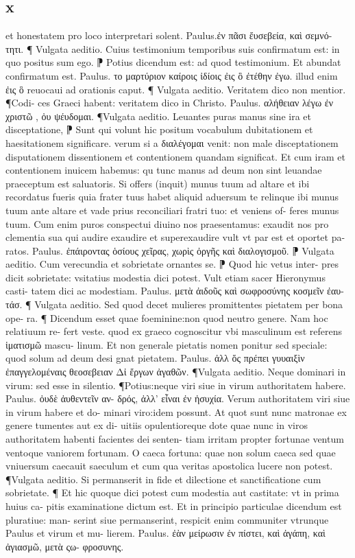 \documentclass{article}
\begin{document}
\begin{pages}
\section*{x }
\marginpar{[ p.204 ]}\pstart et honestatem pro loco interpretari solent. Paulus.ἐν πᾶσι ἔυσεβεία, καὶ σεμνό-   τητι.  ¶ Vulgata aeditio. Cuius testimonium temporibus suis confirmatum est: in quo   positus sum ego. ⁋ Potius dicendum est: ad quod testimonium. Et abundat confirmatum est. Paulus. το μαρτύριον καίροις ἰδίοις ἐις ὃ ἐτέθην ἐγω. illud enim ἐις ὃ   reuocaui ad orationis caput. ¶ Vulgata aeditio. Veritatem dico  non mentior. ¶Codi- ces Graeci habent: veritatem dico in Christo. Paulus. αλήθειαν λέγω ἐν χριστῶ , ὀυ ψέυδομαι. ¶Vulgata aeditio. Leuantes puras manus sine ira et disceptatione, ⁋ Sunt qui volunt hic positum vocabulum dubitationem et haesitationem significare. verum si a διαλέγομαι venit: non male disceptationem  disputationem dissentionem et contentionem quandam significat. Et cum iram et contentionem inuicem habemus: qu tunc manus ad deum non sint leuandae praeceptum est saluatoris. Si offers (inquit) munus tuum ad altare et ibi recordatus fueris quia frater tuus habet aliquid aduersum te  relinque ibi munus tuum ante altare et vade prius reconciliari fratri tuo: et veniens of- feres munus tuum. Cum enim puros conspectui diuino nos praesentamus: exaudit nos pro clementia sua qui audire exaudire  et superexaudire vult  vt par est et oportet pa- ratos. Paulus. ἐπάιροντας ὁσίους χεῖρας, χωρὶς ὀργῆς καὶ διαλογισμοῦ. ⁋ Vulgata aeditio. Cum verecundia et sobrietate ornantes se. ⁋ Quod hic vetus inter- pres dicit sobrietate: vsitatius modestia dici potest. Vult etiam sacer Hieronymus casti- tatem dici ac modestiam. Paulus. μετὰ ἀιδοῦς καὶ σωφροσύνης κοσμεῖν ἐαυ-   τάσ. ¶ Vulgata aeditio. Sed quod decet mulieres promittentes pietatem per bona ope- ra. ¶ Dicendum esset quae  foeminine:non quod  neutro genere. Nam hoc relatiuum re- fert veste. quod ex graeco cognoscitur vbi masculinum est referens ἱματισμῶ mascu- linum. Et non generale pietatis nomen ponitur sed speciale: quod solum ad deum desi gnat pietatem. Paulus. ἀλλ ὅς  πρέπει γυυαιξὶν ἐπαγγελομέναις θεοσεβειαν   Δἰ ἔργων ἀγαθῶν. ¶Vulgata aeditio. Neque  dominari in virum: sed esse in silentio. ¶Potius:neque  viri siue in virum authoritatem habere. Paulus. ὀυδὲ ἀυθεντεῖν αν- δρός, ἀλλ’ εἶναι ἐν ἠσυχία. Verum authoritatem viri siue in virum habere  et do- minari viro:idem possunt. At quot sunt nunc matronae ex genere tumentes aut ex di- uitiis opulentioreque  dote  quae nunc in viros authoritatem habenti facientes dei senten- tiam irritam propter fortunae ventum ventoque  vaniorem fortunam. O caeca fortuna: quae non solum caeca sed quae vniuersum caecauit saeculum et cum qua veritas apostolica lucere   non potest. ¶Vulgata aeditio. Si permanserit in fide et dilectione  et sanctificatione cum   sobrietate. ¶ Et hic quoque  dici potest cum modestia aut castitate: vt in prima huius ca- pitis examinatione dictum est. Et in principio particulae dicendum est pluratiue: man- serint siue permanserint, respicit enim communiter vtrunque  Paulus  et virum  et mu- lierem. Paulus. ἐὰν μείρωσιν ἐν πίστει, καὶ ἀγάπη, καὶ ἀγιασμῶ, μετὰ ςω- φροσυνης.  \pend

\end{pages}
\end{document}
